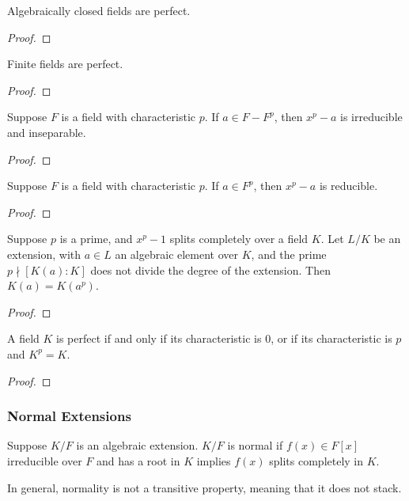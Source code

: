 \begin{proposition}
    Algebraically closed fields are perfect.
\end{proposition}
\begin{proof}
\end{proof}
\begin{theorem}
    Finite fields are perfect.
\end{theorem}
\begin{proof}
\end{proof}

\begin{lemma}
    Suppose \(F\) is a field with characteristic \(p\).
    If \(a \in F - F^p\), then \(x^p - a\) is irreducible and inseparable.
\end{lemma}
\begin{proof}
\end{proof}
\begin{lemma}
    Suppose \(F\) is a field with characteristic \(p\).
    If \(a \in F^p\), then \(x^p - a\) is reducible.
\end{lemma}
\begin{proof}
\end{proof}
\begin{proposition}
    Suppose \(p\) is a prime,
    and \(x^p - 1\) splits completely over a field \(K\).
    Let \(L/K\) be an extension, with \(a \in L\) an algebraic element over \(K\),
    and the prime \(p \nmid [K(a):K]\) does not divide the degree of the extension.
    Then \(K(a) = K(a^p)\).
\end{proposition}
\begin{proof}
\end{proof}
\begin{theorem}
    A field \(K\) is perfect
    if and only if its characteristic is 0,
    or if its characteristic is \(p\) and \(K^p = K\).
\end{theorem}
\begin{proof}
\end{proof}

\subsubsection*{Normal Extensions}

\begin{definition}
    Suppose \(K/F\) is an algebraic extension.
    \(K/F\) is normal if \(f(x) \in F[x]\) irreducible over \(F\)
    and has a root in \(K\) implies \(f(x)\) splits completely in \(K\).
\end{definition}
\begin{remark}
    In general, normality is not a transitive property,
    meaning that it does not stack.
\end{remark}

